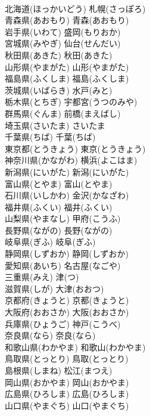 \documentclass[8pt]{extreport}
\begin{document}
\begin{CJK}{UTF8}{min}
\\	北海道(ほっかいどう) 札幌(さっぽろ)
\\	青森県(あおもり) 青森(あおもり)
\\	岩手県(いわて) 盛岡(もりおか)
\\	宮城県(みやぎ) 仙台(せんだい)
\\	秋田県(あきた) 秋田(あきた)
\\	山形県(やまがた) 山形(やまがた)
\\	福島県(ふくしま) 福島(ふくしま)
\\	茨城県(いばらき) 水戸(みと)
\\	栃木県(とちぎ) 宇都宮(うつのみや)
\\	群馬県(ぐんま) 前橋(まえばし)
\\	埼玉県(さいたま) さいたま
\\	千葉県(ちば) 千葉(ちば)
\\	東京都(とうきょう) 東京(とうきょう)
\\	神奈川県(かながわ) 横浜(よこはま)
\\	新潟県(にいがた) 新潟(にいがた)
\\	富山県(とやま) 富山(とやま)
\\	石川県(いしかわ) 金沢(かなざわ)
\\	福井県(ふくい) 福井(ふくい)
\\	山梨県(やまなし) 甲府(こうふ)
\\	長野県(ながの) 長野(ながの)
\\	岐阜県(ぎふ) 岐阜(ぎふ)
\\	静岡県(しずおか) 静岡(しずおか)
\\	愛知県(あいち) 名古屋(なごや)
\\	三重県(みえ) 津(つ)
\\	滋賀県(しが) 大津(おおつ)
\\	京都府(きょうと) 京都(きょうと)
\\	大阪府(おおさか) 大阪(おおさか)
\\	兵庫県(ひょうご) 神戸(こうべ)
\\	奈良県(なら) 奈良(なら)
\\	和歌山県(わかやま) 和歌山(わかやま)
\\	鳥取県(とっとり) 鳥取(とっとり)
\\	島根県(しまね) 松江(まつえ)
\\	岡山県(おかやま) 岡山(おかやま)
\\	広島県(ひろしま) 広島(ひろしま)
\\	山口県(やまぐち) 山口(やまぐち)

\end{CJK}
\end{document}
